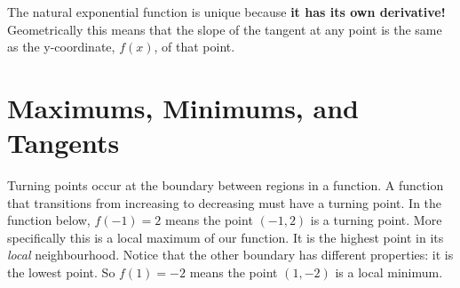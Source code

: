 The natural exponential function is unique because \textbf{it has its own derivative!} Geometrically this means that the slope of the tangent at any point is the same as the y-coordinate, $f(x)$, of that point. 

\section{Maximums, Minimums, and Tangents}
Turning points occur at the boundary between regions in a function.  A function that transitions from increasing to decreasing must have a turning point. In the function below, $f(-1)=2$ means the point $(-1,2)$ is a turning point. More specifically this is a local maximum of our function. It is the highest point in its \emph{local} neighbourhood. Notice that the other boundary has different properties: it is the lowest point. So $f(1)=-2$ means the point $(1,-2)$ is a local minimum.

